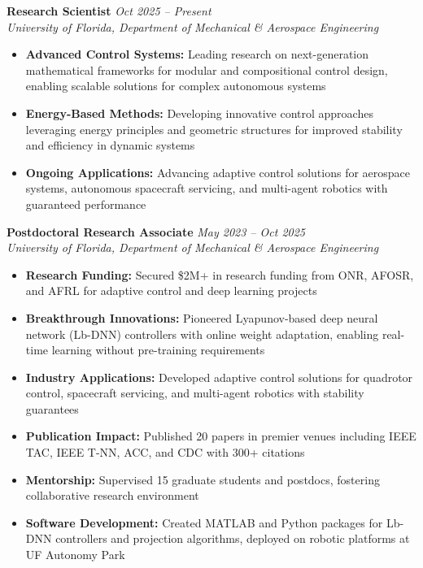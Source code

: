 \documentclass[10pt, letterpaper]{article}
\begin{document}
\textbf{Research Scientist} \hfill \textit{Oct 2025 -- Present}\\
\textit{University of Florida, Department of Mechanical \& Aerospace Engineering}
\begin{itemize}[leftmargin=20pt, itemsep=1pt]
    \item \textbf{Advanced Control Systems:} Leading research on next-generation mathematical frameworks for modular and compositional control design, enabling scalable solutions for complex autonomous systems
    \item \textbf{Energy-Based Methods:} Developing innovative control approaches leveraging energy principles and geometric structures for improved stability and efficiency in dynamic systems
    \item \textbf{Ongoing Applications:} Advancing adaptive control solutions for aerospace systems, autonomous spacecraft servicing, and multi-agent robotics with guaranteed performance
\end{itemize}

\textbf{Postdoctoral Research Associate} \hfill \textit{May 2023 -- Oct 2025}\\
\textit{University of Florida, Department of Mechanical \& Aerospace Engineering}
\begin{itemize}[leftmargin=20pt, itemsep=1pt]
    \item \textbf{Research Funding:} Secured \$2M+ in research funding from ONR, AFOSR, and AFRL for adaptive control and deep learning projects
    \item \textbf{Breakthrough Innovations:} Pioneered Lyapunov-based deep neural network (Lb-DNN) controllers with online weight adaptation, enabling real-time learning without pre-training requirements
    \item \textbf{Industry Applications:} Developed adaptive control solutions for quadrotor control, spacecraft servicing, and multi-agent robotics with stability guarantees
    \item \textbf{Publication Impact:} Published 20 papers in premier venues including IEEE TAC, IEEE T-NN, ACC, and CDC with 300+ citations
    \item \textbf{Mentorship:} Supervised 15 graduate students and postdocs, fostering collaborative research environment
    \item \textbf{Software Development:} Created MATLAB and Python packages for Lb-DNN controllers and projection algorithms, deployed on robotic platforms at UF Autonomy Park
\end{itemize}
\end{document}
